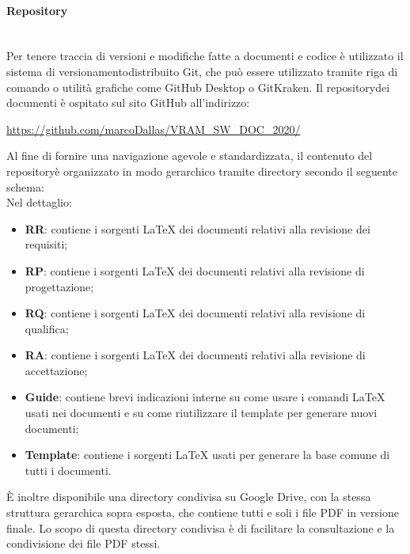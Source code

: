 	\paragraph{Repository}\mbox{}\\ [1mm]
		Per tenere traccia di versioni e modifiche fatte a documenti e codice è utilizzato il sistema di versionamento\glosp distribuito Git, che può essere utilizzato tramite riga di comando o utilità grafiche come GitHub Desktop o GitKraken.
		Il repository\glosp dei documenti è ospitato sul sito GitHub all'indirizzo: 
		\begin{center}
			\url{https://github.com/marcoDallas/VRAM_SW_DOC_2020/}
		\end{center}
		Al fine di fornire una navigazione agevole e standardizzata, il contenuto del repository\glosp è organizzato in modo gerarchico tramite directory secondo il seguente schema:
		\newline
		\mbox{}\\ %
		Nel dettaglio:
		\begin{itemize}
			\item \textbf{RR}: contiene i sorgenti \LaTeX \xspace dei documenti relativi alla revisione dei requisiti;
			\item \textbf{RP}: contiene i sorgenti \LaTeX \xspace dei documenti relativi alla revisione di progettazione\glo;
			\item \textbf{RQ}: contiene i sorgenti \LaTeX \xspace dei documenti relativi alla revisione di qualifica;
			\item \textbf{RA}: contiene i sorgenti \LaTeX \xspace dei documenti relativi alla revisione di accettazione; 
			\item \textbf{Guide}: contiene brevi indicazioni interne su come usare i comandi \LaTeX \xspace usati nei documenti e su come riutilizzare il template per generare nuovi documenti;
			\item \textbf{Template}: contiene i sorgenti \LaTeX \xspace usati per generare la base comune di tutti i documenti.
		\end{itemize}
		È inoltre disponibile una directory condivisa su Google Drive, con la stessa struttura gerarchica sopra esposta, che contiene tutti e soli i file PDF in versione finale. Lo scopo di questa directory condivisa è di facilitare la consultazione e la condivisione dei file PDF stessi.
		
